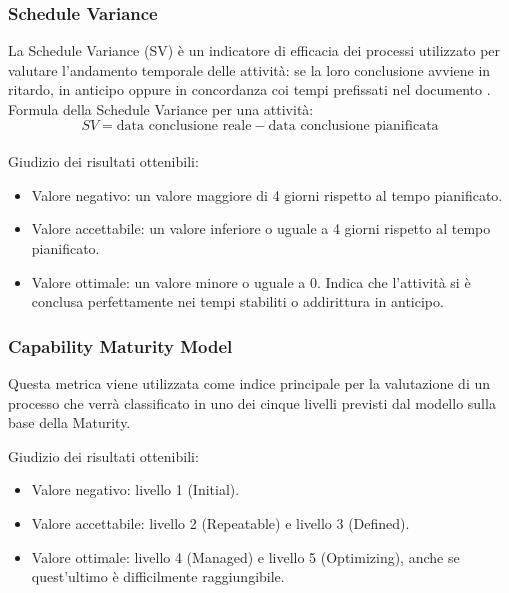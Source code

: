 \documentclass[a4paper, titlepage]{article}
\begin{document}
\subsubsection{Schedule Variance}
\label{par:SV}
La Schedule Variance (SV) è un indicatore di efficacia dei processi utilizzato per valutare l'andamento temporale delle attività: se la loro conclusione avviene in ritardo, in anticipo oppure in concordanza coi tempi prefissati nel documento .
\newline Formula della Schedule Variance per una attività:
\begin{displaymath}
SV= \mbox{data conclusione reale} - \mbox{data conclusione pianificata}
\end{displaymath}
\\Giudizio dei risultati ottenibili:
\begin{itemize}
\item Valore negativo: un valore maggiore di 4 giorni rispetto al tempo pianificato.
\item Valore accettabile: un valore inferiore o uguale a 4 giorni rispetto al tempo pianificato.
\item Valore ottimale: un valore minore o uguale a 0. Indica che l'attività si è conclusa perfettamente nei tempi stabiliti o addirittura in anticipo. 
\end{itemize}

\subsubsection{Capability Maturity Model}
\label{par:cmm}
Questa metrica viene utilizzata come indice principale per la valutazione di un processo che verrà classificato in uno dei cinque livelli previsti dal modello sulla base della Maturity.
\par Giudizio dei risultati ottenibili:
\begin{itemize}
\item Valore negativo: livello 1 (Initial).
\item Valore accettabile: livello 2 (Repeatable) e livello 3 (Defined).
\item Valore ottimale: livello 4 (Managed) e livello 5 (Optimizing), anche se quest'ultimo è difficilmente raggiungibile.
\end{itemize}
\end{document}
